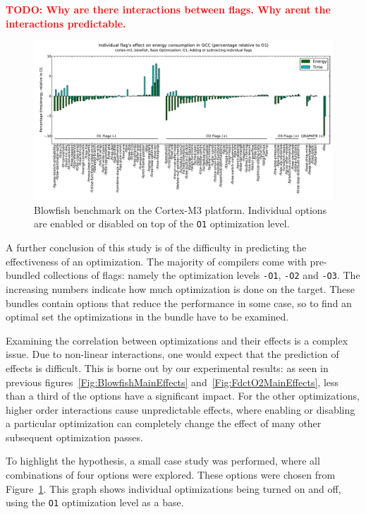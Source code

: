 \documentclass[twocolumn]{article}
\newcommand{\todo}[1]{\textbf{\textcolor{red}{#1}}}
\let\oldcaption\caption
\renewcommand{\caption}[1]{\oldcaption{\textup{#1}}}
\begin{document}
\todo{TODO: Why are there interactions between flags. Why arent the interactions predictable.}

\begin{figure}[bt]
	\includegraphics[width=\linewidth,clip,trim=0.5cm 0 0cm 1.8cm]{cortex-m3/O1_addsub_blowfish.pdf}
	\caption{Blowfish benchmark on the Cortex-M3 platform. Individual options are enabled or disabled on top of the \texttt{O1} optimization level.}
	\label{Fig:AddsubO1Blowfish}
\end{figure}

A further conclusion of this study is of the difficulty in predicting the effectiveness of an optimization. The majority of compilers come with pre-bundled collections of flags: namely the optimization levels \texttt{-O1}, \texttt{-O2} and \texttt{-O3}. The increasing numbers indicate how much optimization is done on the target. These bundles contain options that reduce the performance in some case, so to find an optimal set the optimizations in the bundle have to be examined.

Examining the correlation between optimizations and their effects is a complex issue. Due to non-linear interactions, one would expect that the prediction of effects is difficult. This is borne out by our experimental results: as seen in previous figures~\ref{Fig:BlowfishMainEffects} and~\ref{Fig:FdctO2MainEffects}, less than a third of the options have a significant impact. For the other optimizations, higher order interactions cause unpredictable effects, where enabling or disabling a particular optimization can completely change the effect of many other subsequent optimization passes.

To highlight the hypothesis, a small case study was performed, where all combinations of four options were explored. These options were chosen from Figure~\ref{Fig:AddsubO1Blowfish}. This graph shows individual optimizations being turned on and off, using the \texttt{O1} optimization level as a base.
\end{document}
